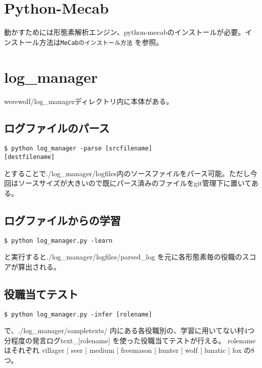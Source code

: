 ﻿\documentclass[a4paper,twocolumn]{jsarticle}
\begin{document}
\section{Python-Mecab}
動かすためには形態素解析エンジン、python-mecabのインストールが必要。インストール方法は\verb+MeCabのインストール方法+ \cite{mecab-install}を参照。



\section{log\_manager}
werewolf/log\_managerディレクトリ内に本体がある。

\subsection{ログファイルのパース}
\begin{verbatim}
$ python log_manager -parse [srcfilename] 
[destfilename] 
\end{verbatim}
とすることで./log\_manager/logfiles内のソースファイルをパース可能。ただし今回はソースサイズが大きいので既にパース済みのファイルをgit管理下に置いてある。


\subsection{ログファイルからの学習}
\begin{verbatim}
$ python log_manager.py -learn 
\end{verbatim}
と実行すると./log\_manager/logfiles/parsed\_log を元に各形態素毎の役職のスコアが算出される。


\subsection{役職当てテスト}
\begin{verbatim}
$ python log_manager.py -infer [rolename] 
\end{verbatim}
で、./log\_manager/sampletexts/ 内にある各役職別の、学習に用いてない村4つ分程度の発言ログtext\_[rolename] を使った役職当てテストが行える。
rolename はそれぞれ villager | seer | medium | freemason | hunter | wolf | lunatic | fox の8つ。
\end{document}
